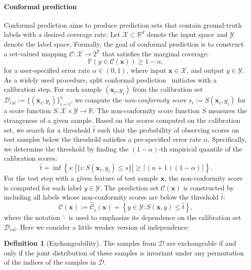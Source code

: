 \documentclass{article}
\newcommand{\X}{\mathcal{X}}
\newcommand{\Y}{\mathcal{Y}}
\newcommand{\C}{\mathcal{C}}
\newcommand{\1}{\mathbbm{1}}
\newcommand{\offf}[1]{\left\{#1\right\}}
\theoremstyle{plain}
\theoremstyle{definition}
\newtheorem{definition}[theorem]{Definition}
\theoremstyle{remark}
\begin{document}
\paragraph{Conformal prediction} 
Conformal prediction \citep{vovk2005algorithmic} aims to produce prediction sets that contain ground-truth labels with a desired coverage rate. 
Let $\mathcal{X} \subset \mathbb{R}^d$ denote the input space and $\mathcal{Y}$ denote the label space. 
Formally, the goal of conformal prediction is to construct a set-valued mapping $\mathcal{C}:\mathcal{X}\rightarrow 2^\mathcal{Y}$ that satisfies the marginal coverage:
\begin{equation}
\label{eq:validity}
    \mathbb{P}(y\in {\C}(\boldsymbol{x}))\geq 1-\alpha,  
\end{equation}
for a user-specified error rate $\alpha\in(0,1)$, where input \(\boldsymbol{x} \in\mathcal{X}\), and output \(y \in \mathcal{Y}\). 
As a widely used procedure, split conformal prediction~\citep{papadopoulos2008inductive} initiates with a calibration step.
For each sample $(\boldsymbol{x}_i, y_i)$ from the calibration set $\mathcal{D}_{\text{cal}}:=\{(\boldsymbol{x}_i,y_i)\}_{i=1}^n$, we compute the \textit{non-conformity score} $s_i := S(\boldsymbol{x}_i, y_i)$ for a score function $S:\X\times\Y\to\mathbb{R}$. 
The non-conformity score function $S$ measures the strangeness of a given sample.  
Based on the scores computed on the calibration set, we search for a threshold $\hat{t}$ such that the probability of observing scores on test samples below the threshold satisfies a pre-specified error rate $\alpha$. 
Specifically, we determine the threshold by finding the $(1-\alpha)$-th empirical quantile of the calibration scores: 
\begin{equation}\label{eq:threshold}
\hat{t}=\inf\offf{s:|\{i:S(\boldsymbol{x}_{i},y_{i})\leq s\}| \geq \lceil(n+1)(1-\alpha)\rceil}.
\end{equation}
For the test step with a given feature of test sample \(\boldsymbol{x}\), the non-conformity score is computed for each label \(y \in \mathcal{Y}\). 
The prediction set \({\mathcal{C}}(\boldsymbol{x})\) is constructed by including all labels whose non-conformity scores are below the threshold \(\hat{t}\):
\begin{equation} \label{eq:cp_set}
{\C}(\boldsymbol{x}) := \widehat{\C}_{\hat{t}}(\boldsymbol{x}) = \offf{y \in \mathcal{Y}: S(\boldsymbol{x},y)\leq\hat{t}},
\end{equation}
where the notation $\widehat{\cdot}$ is used to emphasize its dependence on the calibration set $\mathcal{D}_{\text{cal}}$.
Here we consider a little weaker version of independence:
\begin{definition}[Exchangeability]
    The samples from $\mathcal{D}$ are exchangeable if and only if the joint distribution of these samples is invariant under any permutation of the indices of the samples in $\mathcal{D}$.
\end{definition}
\end{document}
